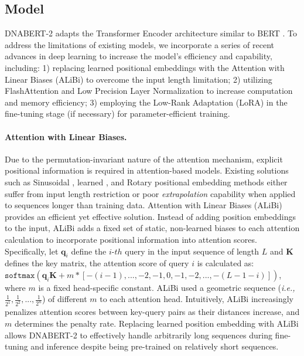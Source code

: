 \documentclass{article}
\begin{document}
\subsection{Model}
\label{subsec:model_architecture}
DNABERT-2 adapts the Transformer Encoder architecture similar to BERT \citep{bert}. To address the limitations of existing models, we incorporate a series of recent advances in deep learning to increase the model's efficiency and capability, including: 1) replacing learned positional embeddings with the Attention with Linear Biases (ALiBi) \citep{alibi} to overcome the input length limitation; 2) utilizing FlashAttention \citep{flashattention} and Low Precision Layer Normalization to increase computation and memory efficiency; 3) employing the Low-Rank Adaptation (LoRA) \citep{lora} in the fine-tuning stage (if necessary) for parameter-efficient training.

\paragraph{Attention with Linear Biases. } Due to the permutation-invariant nature of the attention mechanism, explicit positional information is required in attention-based models. Existing solutions such as Sinusoidal \citep{transformer}, learned \citep{bert}, and Rotary \citep{su2021roformer} positional embedding methods either suffer from input length restriction or poor \textit{extrapolation} capability when applied to sequences longer than training data. Attention with Linear Biases (ALiBi) provides an efficient yet effective solution. Instead of adding position embeddings to the input, ALiBi adds a fixed set of static, non-learned biases to each attention calculation to incorporate positional information into attention scores. 
Specifically, let $\mathbf{q}_i$ define the $i$-$th$ query in the input sequence of length $L$ and $\mathbf{K}$ defines the key matrix, the attention score of query $i$ is calculated as: $\texttt{softmax}(\mathbf{q}_i\mathbf{K} + m * [-(i-1), ..., -2, -1, 0, -1, -2, ..., -(L-1-i)])$, where $m$ is a fixed head-specific constant. ALiBi used a geometric sequence (\textit{i.e.,} $\frac{1}{2^1}, \frac{1}{2^2}, ..., \frac{1}{2^n}$) of different $m$ to each attention head. Intuitively, ALiBi increasingly penalizes attention scores between key-query pairs as their distances increase, and $m$ determines the penalty rate. 
Replacing learned position embedding with ALiBi allows DNABERT-2 to effectively handle arbitrarily long sequences during fine-tuning and inference despite being pre-trained on relatively short sequences.
\end{document}
